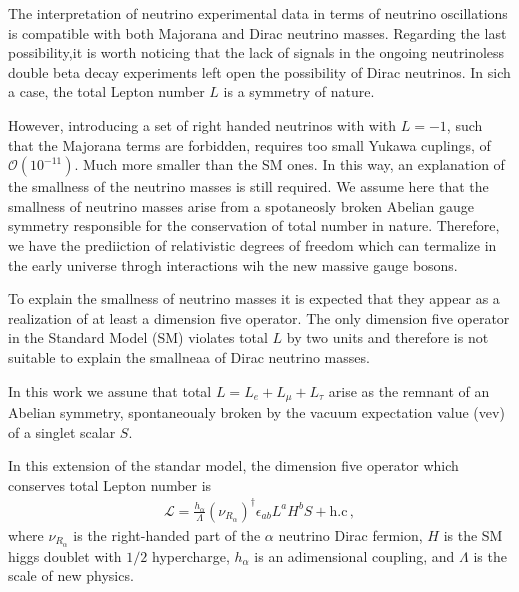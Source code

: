 





The interpretation of neutrino experimental data in terms of neutrino oscillations  is compatible with both Majorana and Dirac neutrino masses. Regarding the last possibility,it is worth noticing that the lack of signals in the ongoing neutrinoless double beta decay experiments left  open the possibility of Dirac neutrinos. In sich a case, the total Lepton number $L$ is a symmetry of nature.

However, introducing a set of right handed neutrinos with with $L=-1$,
such that the Majorana terms are forbidden, requires too small Yukawa cuplings, of $\mathcal{O}(10^{-11})$. Much more smaller than the SM ones. In this way, an explanation of the smallness of the neutrino masses is still required. We assume here that the smallness of neutrino masses arise from a spotaneosly broken Abelian gauge symmetry responsible for the conservation of total number in nature. Therefore, we have the prediiction of relativistic degrees of freedom which can termalize in the early universe throgh interactions wih the new massive gauge bosons.

To explain the smallness of neutrino masses it is expected that they appear as a realization of at least a  dimension five operator. The only dimension five operator in the Standard Model (SM) violates total $L$  by two units and therefore is not suitable to explain the smallneaa of Dirac neutrino masses.

In this work we assune that total $L=L_e+L_\mu+L_\tau$ arise as the remnant of an Abelian symmetry, spontaneoualy broken by the vacuum expectation value (vev) of a singlet scalar $S$. %

In this extension of the standar model, the dimension five operator which conserves total Lepton number is~\cite{}
\begin{align}
  \mathcal{L}=
  \frac{h_{\alpha}}{\Lambda} (\nu_{R_\alpha})^\dagger \epsilon_{ab}L^a H^b S + \text{h.c}\,,
\end{align}
where $\nu_{R_\alpha}$ is the right-handed part of  the $\alpha$ neutrino Dirac fermion, $H$ is the SM higgs doublet with $1/2$ hypercharge,
$h_{\alpha}$ is an adimensional coupling, and $\Lambda$ is the scale of new physics.


